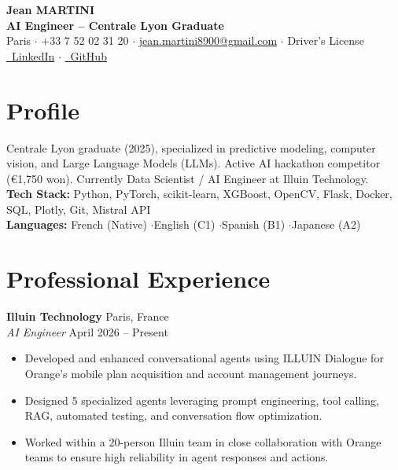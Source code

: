 \documentclass[10pt, a4paper]{article}
\begin{document}
\begin{center}
    {\Huge \bfseries \color{primary} Jean MARTINI}\\[4pt]
    {\large \bfseries AI Engineer -- Centrale Lyon Graduate}\\[6pt]
    \small
    Paris \quad$\cdot$\quad 
    +33 7 52 02 31 20 \quad$\cdot$\quad 
    \href{mailto:jean.martini8900@gmail.com}{jean.martini8900@gmail.com} \quad$\cdot$\quad 
    Driver's License\\[2pt]
    \href{https://linkedin.com/in/jean-martini-64a017228/}{\faLinkedin\ LinkedIn} \quad$\cdot$\quad 
    \href{https://github.com/Jean8900}{\faGithub\ GitHub}
\end{center}

\section{Profile}
Centrale Lyon graduate (2025), specialized in predictive modeling, computer vision, and Large Language Models (LLMs). Active AI hackathon competitor (€1,750 won). Currently Data Scientist / AI Engineer at Illuin Technology.\\[3pt]
\textbf{Tech Stack:} Python, PyTorch, scikit-learn, XGBoost, OpenCV, Flask, Docker, SQL, Plotly, Git, Mistral API\\
\textbf{Languages:} French (Native) \quad$\cdot$\quad English (C1) \quad$\cdot$\quad Spanish (B1) \quad$\cdot$\quad Japanese (A2)

\section{Professional Experience}

\textbf{Illuin Technology} \hfill Paris, France\\
\textit{AI Engineer} \hfill \small April 2026 -- Present
\begin{itemize}
    \item Developed and enhanced conversational agents using ILLUIN Dialogue for Orange's mobile plan acquisition and account management journeys.
    \item Designed 5 specialized agents leveraging prompt engineering, tool calling, RAG, automated testing, and conversation flow optimization.
    \item Worked within a 20-person Illuin team in close collaboration with Orange teams to ensure high reliability in agent responses and actions.
\end{itemize}
\end{document}
